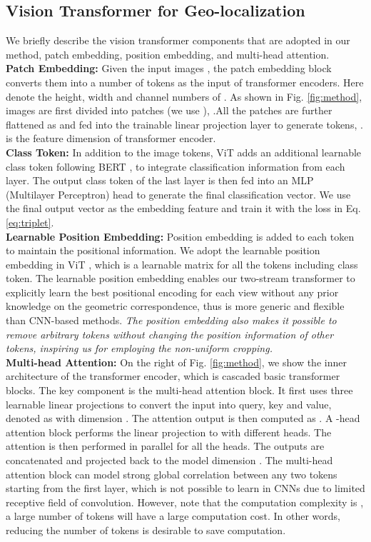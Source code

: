 \documentclass[10pt,twocolumn,letterpaper]{article}
\begin{document}
\subsection{Vision Transformer for Geo-localization} \label{sec:vit}
We briefly describe the vision transformer \cite{vit} components that are adopted in our method, \ie patch embedding, position embedding, and multi-head attention. \\\textbf{Patch Embedding:} Given the input images , the patch embedding block converts them into a number of tokens as the input of transformer encoders. Here  denote the height, width and channel numbers of . As shown in Fig. \ref{fig:method}, images are first divided into    patches (we use ), .All the  patches are further flattened as  and fed into the trainable linear projection layer to generate  tokens, .  is the feature dimension of transformer encoder.  \\
\textbf{Class Token:} In addition to the  image tokens, ViT \cite{vit} adds an additional learnable class token following BERT \cite{devlin2018bert}, to integrate classification information from each layer. The output class token of the last layer is then fed into an MLP (Multilayer Perceptron) head to generate the final classification vector. We use the final output vector as the embedding feature and train it with the loss in Eq. \ref{eq:triplet}. \\
\textbf{Learnable Position Embedding:} Position embedding is added to each token   to maintain the positional information. We adopt the learnable position embedding in ViT \cite{vit}, which is a learnable matrix  for all the  tokens including class token. The learnable position embedding enables our two-stream transformer to explicitly learn the best positional encoding for each view without any prior knowledge on the geometric correspondence, thus is more generic and flexible than CNN-based methods. \textit{The position embedding also makes it possible to remove arbitrary tokens without changing the position information of other tokens, inspiring us for employing the non-uniform cropping.} \\
\textbf{Multi-head Attention:} On the right of Fig. \ref{fig:method}, we show the inner architecture of the transformer encoder, which is  cascaded basic transformer blocks. The key component is the multi-head attention block. It first uses three learnable linear projections to convert the input into query, key and value, denoted as  with dimension . The attention output is then computed as . A -head attention block performs the linear projection to  with  different heads. The attention is then performed in parallel for all the  heads. The outputs are concatenated and projected back to the model dimension . The multi-head attention block can model strong global correlation between any two tokens starting from the first layer, which is not possible to learn in CNNs due to limited receptive field of convolution. However, note that the computation complexity is , a large number of tokens will have a large computation cost. In other words, reducing the number of tokens is desirable to save computation. 
\end{document}
